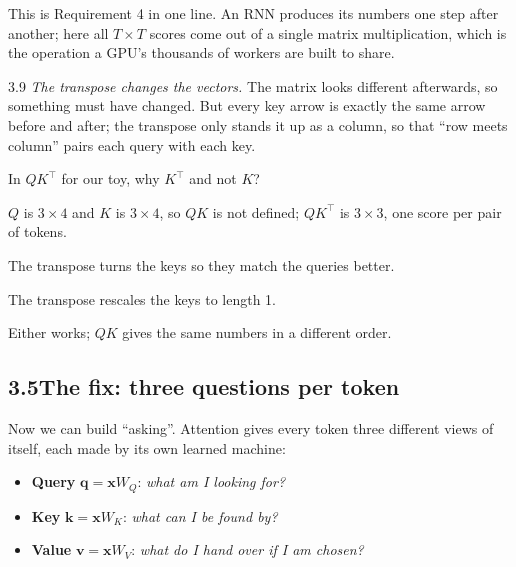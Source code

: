 \Why This is Requirement 4 in one line. An RNN produces its numbers one step after another; here all $T\times T$
scores come out of a single matrix multiplication, which is the operation a GPU's thousands of workers are built
to share.

\begin{wrongidea}{3.9}
\emph{The transpose changes the vectors.} The matrix looks different afterwards, so something must have changed.
But every key arrow is exactly the same arrow before and after; the transpose only stands it up as a column, so
that ``row meets column'' pairs each query with each key.
\end{wrongidea}

\begin{checkq}
In $QK^\top$ for our toy, why $K^\top$ and not $K$?
\begin{options}
\item $Q$ is $3\times4$ and $K$ is $3\times4$, so $QK$ is not defined; $QK^\top$ is $3\times3$, one score per pair of tokens.
\item The transpose turns the keys so they match the queries better.
\item The transpose rescales the keys to length 1.
\item Either works; $QK$ gives the same numbers in a different order.
\end{options}
\end{checkq}


\subsection*{3.5\quad The fix: three questions per token}

Now we can build ``asking''. Attention gives every token three different views of itself, each made by its own
learned machine:
\begin{itemize}
\item \textbf{Query} $\bm{q}=\bm{x}W_Q$: \emph{what am I looking for?}
\item \textbf{Key} $\bm{k}=\bm{x}W_K$: \emph{what can I be found by?}
\item \textbf{Value} $\bm{v}=\bm{x}W_V$: \emph{what do I hand over if I am chosen?}
\end{itemize}

